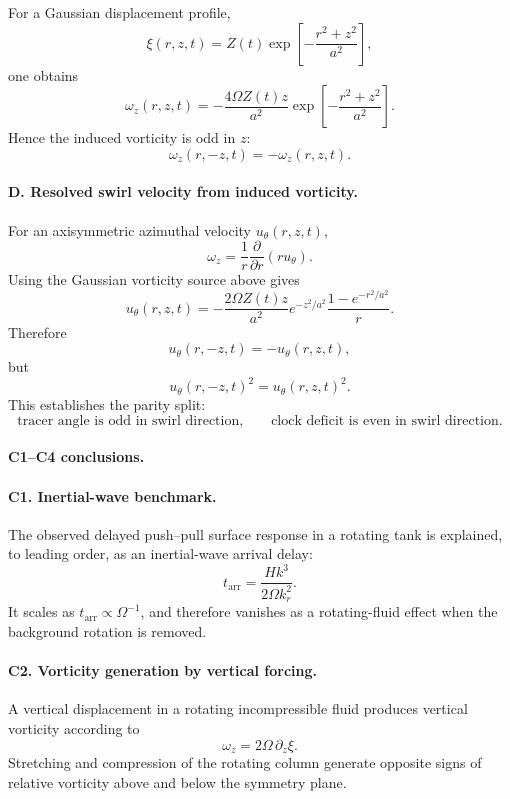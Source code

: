 For a Gaussian displacement profile,
\[
\xi(r,z,t)
=
Z(t)
\exp\!\left[-\frac{r^2+z^2}{a^2}\right],
\]
one obtains
\[
\omega_z(r,z,t)
=
-\frac{4\Omega Z(t)z}{a^2}
\exp\!\left[-\frac{r^2+z^2}{a^2}\right].
\]
Hence the induced vorticity is odd in \(z\):
\[
\boxed{
\omega_z(r,-z,t)=-\omega_z(r,z,t).
}
\]

\paragraph{D. Resolved swirl velocity from induced vorticity.}

For an axisymmetric azimuthal velocity \(u_\theta(r,z,t)\),
\[
\omega_z
=
\frac{1}{r}\frac{\partial}{\partial r}
\left(r u_\theta\right).
\]
Using the Gaussian vorticity source above gives
\[
\boxed{
u_\theta(r,z,t)
=
-\frac{2\Omega Z(t)z}{a^2}
e^{-z^2/a^2}
\frac{1-e^{-r^2/a^2}}{r}.
}
\]
Therefore
\[
u_\theta(r,-z,t)=-u_\theta(r,z,t),
\]
but
\[
u_\theta(r,-z,t)^2=u_\theta(r,z,t)^2.
\]
This establishes the parity split:
\[
\boxed{
\text{tracer angle is odd in swirl direction,}
\qquad
\text{clock deficit is even in swirl direction.}
}
\]

\paragraph{C1--C4 conclusions.}

\paragraph{C1. Inertial-wave benchmark.}
The observed delayed push--pull surface response in a rotating tank is
explained, to leading order, as an inertial-wave arrival delay:
\[
\boxed{
t_{\mathrm{arr}}
=
\frac{Hk^3}{2\Omega k_r^2}.
}
\]
It scales as \(t_{\mathrm{arr}}\propto\Omega^{-1}\), and therefore vanishes
as a rotating-fluid effect when the background rotation is removed.

\paragraph{C2. Vorticity generation by vertical forcing.}
A vertical displacement in a rotating incompressible fluid produces vertical
vorticity according to
\[
\boxed{
\omega_z=2\Omega\,\partial_z\xi.
}
\]
Stretching and compression of the rotating column generate opposite signs of
relative vorticity above and below the symmetry plane.

